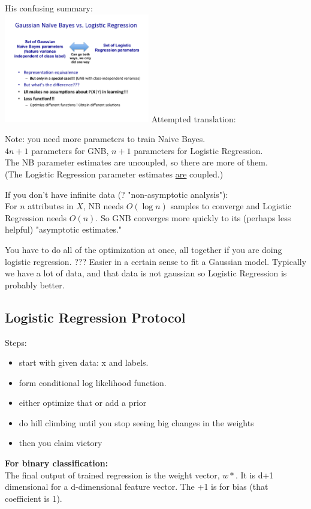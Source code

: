  His confusing summary: \hfill \\
 \includegraphics[width=2.5in]{figures/GNB_vs_LR.pdf}
 Attempted translation: 
 
 Note: you need more parameters to train Naive Bayes. \hfill \\
 $4n + 1$ parameters for GNB,  $n + 1$ parameters for Logistic Regression. \hfill \\
 The NB parameter estimates are uncoupled, so there are more of them.   \hfill \\
 (The Logistic Regression parameter estimates \underline{are} coupled.)

If you don't have infinite data (? "non-asymptotic analysis"): \hfill \\
For $n$ attributes in $X$, NB needs $O(\log n)$ samples to converge and Logistic Regression needs $O(n)$.  
So GNB converges more quickly to its (perhaps less helpful) "asymptotic estimates."

You have to do all of the optimization at once, all together if you are doing logistic regression.  ???
Easier in a certain sense to fit a Gaussian model. 
Typically we have a lot of data, and that data is not gaussian so Logistic Regression is probably better. 

\subsection{Logistic Regression Protocol}
Steps:
\begin{itemize}
	\item start with given data: x and labels.
	\item form conditional log likelihood function.
	\item either optimize that or add a prior
	\item do hill climbing until you stop seeing big changes in the weights
	\item then you claim victory
\end{itemize}

\textbf{For binary classification:} \hfill \\
The final output of trained regression is the weight vector, $w*$.
It is d+1 dimensional for a d-dimensional feature vector.  The +1 is for bias (that coefficient is 1).  \hfill \\

